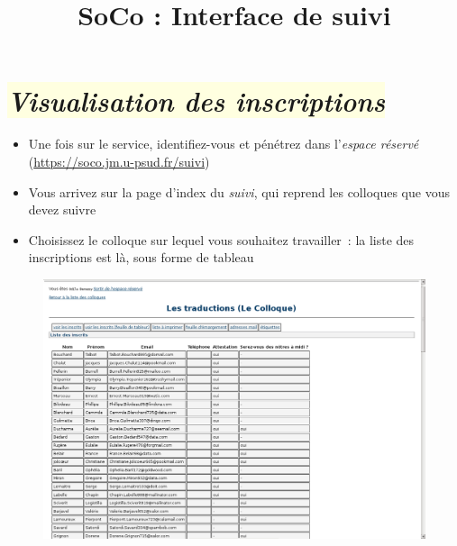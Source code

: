 \documentclass[10pt,a4paper]{article}
\title{\bfseries{SoCo : Interface de suivi}}
\author{}
\date{}
\newcommand{\jaunepale}[1]{\colorbox{LightYellow}{#1}}
\begin{document}
\pagestyle{empty}


\maketitle




\normalsize

\section*{\jaunepale{\emph{Visualisation des inscriptions}}}

\begin{itemize}
  \item Une fois sur le service, identifiez-vous et pénétrez dans l'\emph{espace réservé} (\url{https://soco.jm.u-psud.fr/suivi})
  \item Vous arrivez sur la page d'index du \emph{suivi}, qui reprend les colloques que vous devez suivre
  \item Choisissez le colloque sur lequel vous souhaitez travailler : la liste des inscriptions est là, sous forme de tableau
\end{itemize}

\begin{figure}[h]
  \includegraphics[width=500px]{images/suivi-colloque-3}
 \end{figure}
\end{document}
